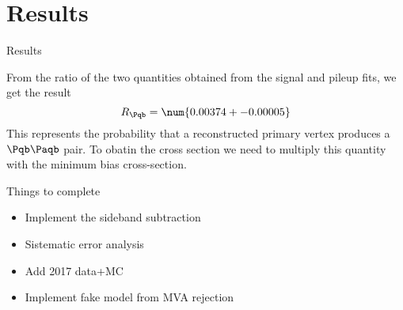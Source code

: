 \section{Results}

\begin{frame}{Results}
	\begin{block}{}
		From the ratio of the two quantities obtained from the signal and pileup fits, we get the result
		\[R_{\Pqb} = \num{0.00374+-0.00005}\]
		This represents the probability that a reconstructed primary vertex produces a $\Pqb\Paqb$ pair.
		To obatin the cross section we need to multiply this quantity with the minimum bias cross-section.
	\end{block}
	
	\begin{block}{Things to complete}
		\begin{itemize}
			\item Implement the sideband subtraction
			\item Sistematic error analysis
			\item Add 2017 data+MC
			\item Implement fake model from MVA rejection
		\end{itemize}
	\end{block}
\end{frame}


